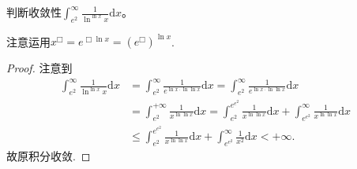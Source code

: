 \documentclass[../../main.tex]{subfiles}%
\begin{document}
\begin{example}
判断收敛性\(\int_{e^2}^{\infty}\frac{1}{\ln^{\ln x}x}\mathrm{d}x\)。 
\end{example}
\begin{note}
注意运用\(x^{\Box}=e^{\Box\ln x}=(e^{\Box})^{\ln x}\).
\end{note}
\begin{proof}

注意到
\begin{align*}
\int_{e^2}^{\infty}\frac{1}{\ln^{\ln x}x}\mathrm{d}x&=\int_{e^2}^{\infty}\frac{1}{e^{\ln x\cdot \ln\ln x}}\mathrm{d}x=\int_{e^2}^{\infty}\frac{1}{e^{\ln x\cdot \ln\ln x}}\mathrm{d}x\\
&=\int_{e^2}^{+\infty}\frac{1}{x^{\ln\ln x}}\mathrm{d}x=\int_{e^2}^{e^{e^2}}\frac{1}{x^{\ln\ln x}}\mathrm{d}x+\int_{e^{e^2}}^{\infty}\frac{1}{x^{\ln\ln x}}\mathrm{d}x\\
&\leqslant \int_{e^2}^{e^{e^2}}\frac{1}{x^{\ln\ln x}}\mathrm{d}x+\int_{e^{e^2}}^{\infty}\frac{1}{x^2}\mathrm{d}x<+\infty.
\end{align*}
故原积分收敛. 

\end{proof}
\end{document}
